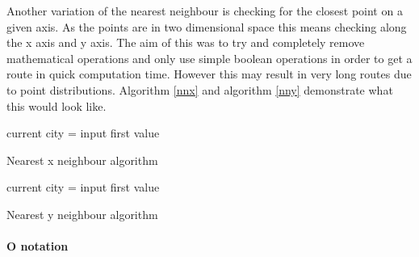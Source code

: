 \documentclass[conference,backref=page]{acmsiggraph}
\begin{document}
Another variation of the nearest neighbour is checking for the closest point on a given axis. As the points are in two dimensional space this means checking along the x axis and y axis. The aim of this was to try and completely remove mathematical operations and only use simple boolean operations in order to get a route in quick computation time. However this may result in very long routes due to point distributions. Algorithm \ref{nnx} and algorithm \ref{nny} demonstrate what this would look like.

\begin{algorithm}[h]
	current city = input first value\\
	\caption{Nearest x neighbour algorithm}
	\label{nnx}
\end{algorithm}

\begin{algorithm}[tbh]
	current city = input first value\\
	\caption{Nearest y neighbour algorithm}
	\label{nny}
\end{algorithm}

\paragraph{O notation} \hfill
 
\end{document}

